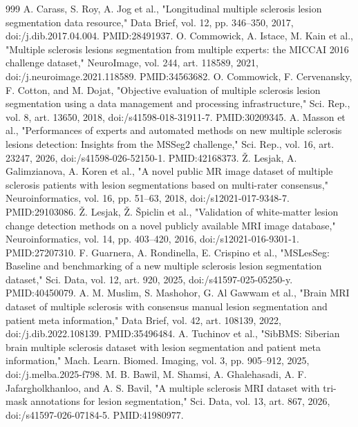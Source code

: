 \documentclass[journal,twoside,web]{ieeecolor}
\begin{document}
\begin{thebibliography}{999}
 A. Carass, S. Roy, A. Jog et al., "Longitudinal multiple sclerosis lesion segmentation data resource," Data Brief, vol. 12, pp. 346--350, 2017, doi:/\allowbreak j.dib.2017.04.004. PMID:28491937.
 O. Commowick, A. Istace, M. Kain et al., "Multiple sclerosis lesions segmentation from multiple experts: the MICCAI 2016 challenge dataset," NeuroImage, vol. 244, art. 118589, 2021, doi:/\allowbreak j.neuroimage.2021.118589. PMID:34563682.
 O. Commowick, F. Cervenansky, F. Cotton, and M. Dojat, "Objective evaluation of multiple sclerosis lesion segmentation using a data management and processing infrastructure," Sci. Rep., vol. 8, art. 13650, 2018, doi:/\allowbreak s41598-018-31911-7. PMID:30209345.
 A. Masson et al., "Performances of experts and automated methods on new multiple sclerosis lesions detection: Insights from the MSSeg2 challenge," Sci. Rep., vol. 16, art. 23247, 2026, doi:/\allowbreak s41598-026-52150-1. PMID:42168373.
 Ž. Lesjak, A. Galimzianova, A. Koren et al., "A novel public MR image dataset of multiple sclerosis patients with lesion segmentations based on multi-rater consensus," Neuroinformatics, vol. 16, pp. 51--63, 2018, doi:/\allowbreak s12021-017-9348-7. PMID:29103086.
 Ž. Lesjak, Ž. Špiclin et al., "Validation of white-matter lesion change detection methods on a novel publicly available MRI image database," Neuroinformatics, vol. 14, pp. 403--420, 2016, doi:/\allowbreak s12021-016-9301-1. PMID:27207310.
 F. Guarnera, A. Rondinella, E. Crispino et al., "MSLesSeg: Baseline and benchmarking of a new multiple sclerosis lesion segmentation dataset," Sci. Data, vol. 12, art. 920, 2025, doi:/\allowbreak s41597-025-05250-y. PMID:40450079.
 A. M. Muslim, S. Mashohor, G. Al Gawwam et al., "Brain MRI dataset of multiple sclerosis with consensus manual lesion segmentation and patient meta information," Data Brief, vol. 42, art. 108139, 2022, doi:/\allowbreak j.dib.2022.108139. PMID:35496484.
 A. Tuchinov et al., "SibBMS: Siberian brain multiple sclerosis dataset with lesion segmentation and patient meta information," Mach. Learn. Biomed. Imaging, vol. 3, pp. 905--912, 2025, doi:/\allowbreak j.melba.2025-f798.
 M. B. Bawil, M. Shamsi, A. Ghalehasadi, A. F. Jafargholkhanloo, and A. S. Bavil, "A multiple sclerosis MRI dataset with tri-mask annotations for lesion segmentation," Sci. Data, vol. 13, art. 867, 2026, doi:/\allowbreak s41597-026-07184-5. PMID:41980977.

\end{thebibliography}
\end{document}
